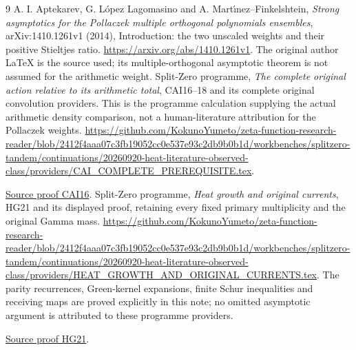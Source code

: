 \documentclass[11pt]{article}
\begin{document}
\begin{thebibliography}{9}
 A. I. Aptekarev, G. L\'opez Lagomasino and
A. Mart\'{\i}nez--Finkelshtein,
\emph{Strong asymptotics for the Pollaczek multiple orthogonal
polynomials ensembles}, arXiv:1410.1261v1 (2014), Introduction:
the two unscaled weights and their positive Stieltjes ratio.
\url{https://arxiv.org/abs/1410.1261v1}.
The original author LaTeX is the source used; its multiple-orthogonal
asymptotic theorem is not assumed for the arithmetic weight.
 Split-Zero programme, \emph{The complete original
action relative to its arithmetic total}, CAI16--18 and its complete original
convolution providers. This is the programme calculation supplying
the actual arithmetic density comparison, not a human-literature
attribution for the Pollaczek weights.
\url{https://github.com/KokunoYumeto/zeta-function-research-reader/blob/2412f4aaa07c3fb19052cc0e537e93c2db9b0b1d/workbenches/splitzero-tandem/continuations/20260920-heat-literature-observed-class/providers/CAI_COMPLETE_PREREQUISITE.tex}.

\href{https://github.com/KokunoYumeto/zeta-function-research-reader/blob/487253b5b01851da5b9b98af4e146fecf1fab902/workbenches/splitzero-tandem/continuations/20260919-full-window-source-products/providers/CAI_COMPLETE_PREREQUISITE.tex\#L284}{Source proof CAI16}.
 Split-Zero programme, \emph{Heat growth and original
currents}, HG21 and its displayed proof, retaining every fixed
primary multiplicity and the original Gamma mass.
\url{https://github.com/KokunoYumeto/zeta-function-research-reader/blob/2412f4aaa07c3fb19052cc0e537e93c2db9b0b1d/workbenches/splitzero-tandem/continuations/20260920-heat-literature-observed-class/providers/HEAT_GROWTH_AND_ORIGINAL_CURRENTS.tex}.
The parity recurrences, Green-kernel expansions, finite Schur
inequalities and receiving maps are proved explicitly in this note;
no omitted asymptotic argument is attributed to these programme
providers.

\href{https://github.com/KokunoYumeto/zeta-function-research-reader/blob/5992ad50c0f2a06921f1fcaded7b4e38097c0739/workbenches/splitzero-tandem/continuations/20260920-original-kernel-mixed-determinants/providers/HEAT_GROWTH_AND_ORIGINAL_CURRENTS.tex\#L374}{Source proof HG21}.
\end{thebibliography}
\end{document}
